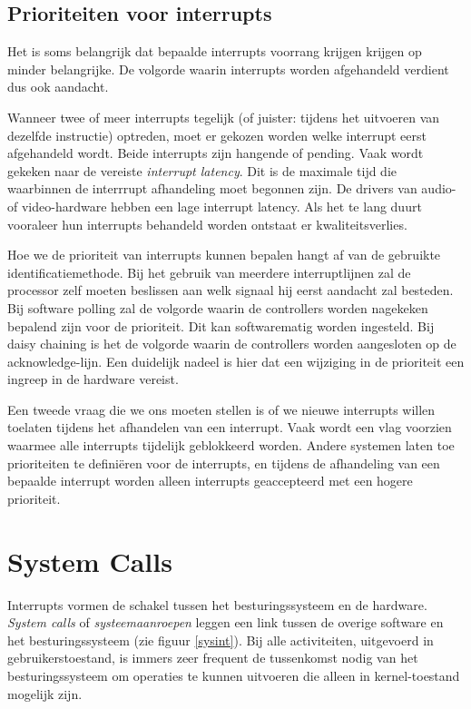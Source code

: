 \subsection{Prioriteiten voor interrupts}

Het is soms belangrijk dat bepaalde interrupts voorrang krijgen
krijgen op minder belangrijke. De volgorde waarin interrupts worden
afgehandeld verdient dus ook aandacht.

Wanneer twee of meer interrupts tegelijk (of juister: tijdens
het uitvoeren van dezelfde instructie) optreden, moet er gekozen
worden welke interrupt eerst afgehandeld wordt. Beide interrupts zijn
hangende of pending. Vaak wordt gekeken naar de vereiste
\emph{interrupt latency}. Dit is de maximale tijd die
waarbinnen de interrrupt afhandeling moet begonnen zijn. De drivers
van audio- of video-hardware hebben een lage interrupt latency. Als
het te lang duurt vooraleer hun interrupts behandeld worden ontstaat
er kwaliteitsverlies.

Hoe we de prioriteit van interrupts kunnen bepalen hangt af van
de gebruikte identificatiemethode. Bij het gebruik van meerdere
interruptlijnen zal de processor zelf moeten beslissen aan welk
signaal hij eerst aandacht zal besteden. Bij software polling zal de
volgorde waarin de controllers worden nagekeken bepalend zijn voor de
prioriteit. Dit kan softwarematig worden ingesteld. Bij daisy chaining
is het de volgorde waarin de controllers worden aangesloten op de
acknowledge-lijn. Een duidelijk nadeel is hier dat een wijziging in de
prioriteit een ingreep in de hardware vereist.

Een tweede vraag die we ons moeten stellen is of we nieuwe
interrupts willen toelaten tijdens het afhandelen van een interrupt.
Vaak wordt een vlag voorzien waarmee alle interrupts tijdelijk
geblokkeerd worden. Andere systemen laten toe prioriteiten te
defini\"eren voor de interrupts, en tijdens de afhandeling van een
bepaalde interrupt worden alleen interrupts geaccepteerd met een
hogere prioriteit.

\section{System Calls}\label{systemcalls}

Interrupts vormen de schakel tussen het besturingssysteem en de
hardware. \emph{System calls} of
\emph{systeemaanroepen} leggen een link tussen de
overige software en het besturingssysteem (zie figuur \ref{sysint}). Bij alle
activiteiten, uitgevoerd in gebruikerstoestand, is immers zeer frequent de
tussenkomst nodig van het besturingssysteem om operaties te kunnen uitvoeren die
alleen in kernel-toestand mogelijk zijn.

